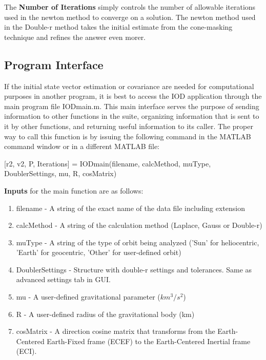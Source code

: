 \documentclass{article}
\begin{document}
				The \textbf{Number of Iterations} simply controls the number of allowable iterations used in the newton method to converge on a solution. The newton method used in the Double-r method takes the initial estimate from the cone-masking technique and 
				refines the answer even morer. \par


                    \subsection{Program Interface}

		        \hspace{0.45 cm} If the initial state vector estimation or covariance are needed for computational purposes in another program, it is best to access the IOD application through
			the main program file IODmain.m. This main interface serves the purpose of sending information to other functions in the suite, organizing information that is sent to it by other functions, and returning 
			useful information to its caller. The proper way to call this function is by issuing the following command in the MATLAB command window or in a  different MATLAB file:
			\newline
			\begin{center}
			[r2, v2, P, Iterations] = IODmain(filename, calcMethod, muType, DoublerSettings,  mu, R, cosMatrix)
			\end{center}
			\hfill
			
			\textbf{Inputs} for the main function are as follows:
			\begin{enumerate}
			\item filename - A string of the exact name of the data file including extension
			\item calcMethod - A string of the calculation method (Laplace, Gauss or Double-r)
			\item muType - A string of the type of orbit being analyzed ('Sun' for heliocentric, 'Earth' for geocentric, 'Other' for user-defined orbit)
			\item DoublerSettings - Structure with double-r settings and tolerances. Same as advanced settings tab in GUI.
			\item mu - A user-defined gravitational parameter ($km^{3}/s^{2}$)
			\item R - A user-defined radius of the gravitational body (km)
			\item cosMatrix - A direction cosine matrix that transforms from the Earth-Centered Earth-Fixed frame (ECEF) to the Earth-Centered Inertial frame (ECI).		
			\newline
			\end{enumerate}
\end{document}
